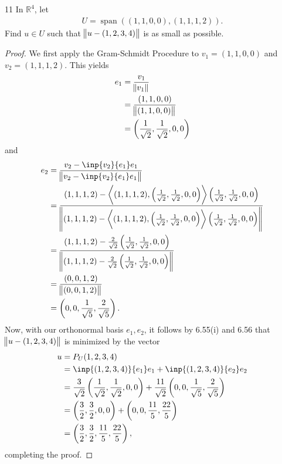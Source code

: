 \documentclass{extarticle}
\newenvironment{problem}[1]{\begin{prob*}{#1}{}}{\end{prob*}}
\newcommand{\R}{\mathbb{R}}
\DeclareMathOperator{\Span}{span}
\begin{document}
\begin{problem}{11}
In $\R^4$, let 
\begin{align*}
U = \Span\left((1, 1, 0, 0), (1, 1, 1, 2)\right).
\end{align*}
Find $u\in U$ such that $\norm{u - (1, 2, 3, 4)}$ is as small as possible.
\end{problem} 
\begin{proof}
We first apply the Gram-Schmidt Procedure to $v_1 = (1, 1, 0, 0)$ and $v_2 = (1, 1, 1, 2)$.  This yields
\begin{align*}
e_1 &= \frac{v_1}{\norm{v_1}} \\
&= \frac{(1, 1, 0, 0)}{\norm{(1, 1, 0, 0)}}\\
&= \left(\frac{1}{\sqrt{2}}, \frac{1}{\sqrt{2}}, 0, 0\right)
\end{align*} 
and
\begin{align*}
e_2 &= \frac{v_2 - \inp{v_2}{e_1}e_1}{\norm{v_2 - \inp{v_2}{e_1}e_1}}\\
&= \frac{(1, 1, 1, 2) - \left\langle(1, 1, 1, 2), \left(\frac{1}{\sqrt{2}}, \frac{1}{\sqrt{2}}, 0, 0\right)\right\rangle \left(\frac{1}{\sqrt{2}}, \frac{1}{\sqrt{2}}, 0, 0\right)}{\norm{(1, 1, 1, 2) - \left\langle(1, 1, 1, 2), \left(\frac{1}{\sqrt{2}}, \frac{1}{\sqrt{2}}, 0, 0\right)\right\rangle \left(\frac{1}{\sqrt{2}}, \frac{1}{\sqrt{2}}, 0, 0\right)}}\\
&= \frac{(1, 1, 1, 2) - \frac{2}{\sqrt{2}} \left(\frac{1}{\sqrt{2}}, \frac{1}{\sqrt{2}}, 0, 0\right)}{\norm{(1, 1, 1, 2) - \frac{2}{\sqrt{2}} \left(\frac{1}{\sqrt{2}}, \frac{1}{\sqrt{2}}, 0, 0\right)}}\\
&= \frac{(0, 0, 1, 2)}{\norm{(0, 0, 1, 2)}}\\
&= \left(0, 0, \frac{1}{\sqrt{5}}, \frac{2}{\sqrt{5}}\right).
\end{align*}
Now, with our orthonormal basis $e_1, e_2$, it follows by 6.55(i) and 6.56 that $\norm{u - (1, 2, 3, 4)}$ is minimized by the vector
\begin{align*}
u &= P_U(1, 2, 3, 4)\\
&= \inp{(1, 2, 3, 4)}{e_1} e_1 + \inp{(1, 2, 3, 4)}{e_2}e_2\\
&= \frac{3}{\sqrt{2}} \left(\frac{1}{\sqrt{2}}, \frac{1}{\sqrt{2}}, 0, 0\right) + \frac{11}{\sqrt{2}}\left(0, 0, \frac{1}{\sqrt{5}}, \frac{2}{\sqrt{5}}\right)\\
&= \left(\frac{3}{2}, \frac{3}{2}, 0, 0\right) +  \left(0, 0, \frac{11}{5}, \frac{22}{5}\right)\\
&=  \left(\frac{3}{2}, \frac{3}{2}, \frac{11}{5}, \frac{22}{5}\right), 
\end{align*}
completing the proof.
\end{proof}
\end{document}
